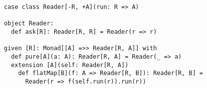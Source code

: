 \begin{algorithm}

\begin{verbatim}
case class Reader[-R, +A](run: R => A)

object Reader:
  def ask[R]: Reader[R, R] = Reader(r => r)

given [R]: Monad[[A] =>> Reader[R, A]] with
  def pure[A](a: A): Reader[R, A] = Reader(_ => a)
  extension [A](self: Reader[R, A])
    def flatMap[B](f: A => Reader[R, B]): Reader[R, B] =
      Reader(r => f(self.run(r)).run(r))
\end{verbatim}

\caption{Reader monad in Scala. %
\label{monad:reader}}
\end{algorithm}